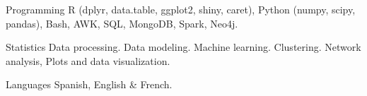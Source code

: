 


\begin{cvskills}


\cvskill
{Programming} %
{R (dplyr, data.table, ggplot2, shiny, caret), Python (numpy, scipy, pandas), Bash, AWK, SQL, MongoDB, Spark, Neo4j.} %


\cvskill
{Statistics} %
{Data processing. Data modeling. Machine learning. Clustering. Network analysis, Plots and data visualization.} %


\cvskill
{Languages} %
{Spanish, English \& French.} %








\end{cvskills}
